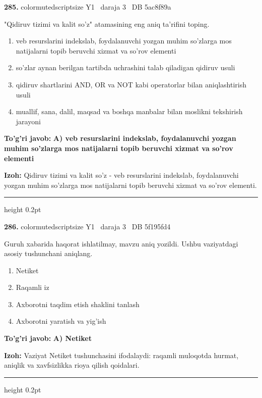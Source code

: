 \documentclass[10pt,a4paper,oneside]{article}
\begin{document}
\noindent\textbf{\color{ink}285.}  {color{muted}scriptsize Y1 \textbullet\ daraja 3 \textbullet\ DB 5ac8f89a}
\par
"Qidiruv tizimi va kalit so'z" atamasining eng aniq ta'rifini toping.
\begin{enumerate}[label=\Alph*),leftmargin=9mm]
\item veb resurslarini indekslab, foydalanuvchi yozgan muhim so'zlarga mos natijalarni topib beruvchi xizmat va so'rov elementi
\item so'zlar aynan berilgan tartibda uchrashini talab qiladigan qidiruv usuli
\item qidiruv shartlarini AND, OR va NOT kabi operatorlar bilan aniqlashtirish usuli
\item muallif, sana, dalil, maqsad va boshqa manbalar bilan moslikni tekshirish jarayoni
\end{enumerate}
\begin{tcolorbox}[enhanced,breakable,colback=teal!4,colframe=teal!50!black,boxrule=0.5pt,arc=1.1mm,left=3mm,right=3mm,top=1.7mm,bottom=1.7mm,before skip=2mm,after skip=2mm]
\textbf{\color{teal}To'g'ri javob:} \textbf{A) veb resurslarini indekslab, foydalanuvchi yozgan muhim so'zlarga mos natijalarni topib beruvchi xizmat va so'rov elementi}
\par\smallskip
\textbf{Izoh:} Qidiruv tizimi va kalit so'z - veb resurslarini indekslab, foydalanuvchi yozgan muhim so'zlarga mos natijalarni topib beruvchi xizmat va so'rov elementi.
\end{tcolorbox}
\vspace{2mm}\hrule height 0.2pt \vspace{3mm}

\noindent\textbf{\color{ink}286.}  {color{muted}scriptsize Y1 \textbullet\ daraja 3 \textbullet\ DB 5f195fd4}
\par
Guruh xabarida haqorat ishlatilmay, mavzu aniq yozildi. Ushbu vaziyatdagi asosiy tushunchani aniqlang.
\begin{enumerate}[label=\Alph*),leftmargin=9mm]
\item Netiket
\item Raqamli iz
\item Axborotni taqdim etish shaklini tanlash
\item Axborotni yaratish va yig'ish
\end{enumerate}
\begin{tcolorbox}[enhanced,breakable,colback=teal!4,colframe=teal!50!black,boxrule=0.5pt,arc=1.1mm,left=3mm,right=3mm,top=1.7mm,bottom=1.7mm,before skip=2mm,after skip=2mm]
\textbf{\color{teal}To'g'ri javob:} \textbf{A) Netiket}
\par\smallskip
\textbf{Izoh:} Vaziyat Netiket tushunchasini ifodalaydi: raqamli muloqotda hurmat, aniqlik va xavfsizlikka rioya qilish qoidalari.
\end{tcolorbox}
\vspace{2mm}\hrule height 0.2pt \vspace{3mm}
\end{document}
